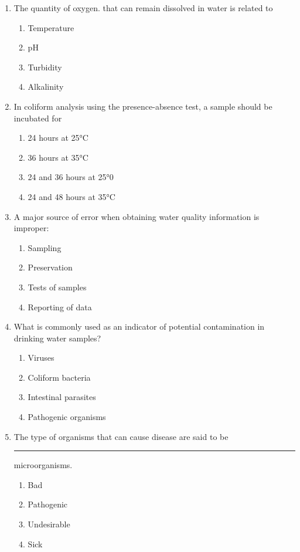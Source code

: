 \documentclass{article}
\begin{document}
\begin{enumerate}[1.]
\item 	The	quantity of oxygen. that can remain dissolved in water is related to
\begin{enumerate}
\item 	Temperature
\item 	pH
\item 	Turbidity
\item 	Alkalinity
\end{enumerate}

\item 	In coliform analysis using the presence-absence test, a sample should be incubated for	
\begin{enumerate}
\item 	24 hours at 25°C
\item 	36 hours at 35°C
\item 	24 and 36 hours at 25°0
\item 	24 and 48 hours at 35°C
\end{enumerate}

\item A major source of error when obtaining water quality information is improper:
\begin{enumerate}
\item Sampling
\item Preservation
\item Tests of samples
\item Reporting of data
\end{enumerate}

\item What is commonly used as an indicator of potential contamination in drinking water samples?
\begin{enumerate}
\item Viruses
\item Coliform bacteria
\item Intestinal parasites
\item Pathogenic organisms
\end{enumerate}

\item The type of organisms that can cause disease are said to be \rule{2cm}{0.3pt}
microorganisms.
\begin{enumerate}
\item Bad
\item Pathogenic
\item Undesirable
\item Sick
\end{enumerate}


\end{enumerate}
\end{document}
